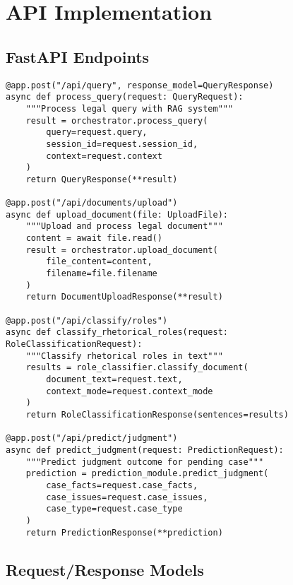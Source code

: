 \documentclass[12pt,a4paper]{article}
\begin{document}
\section{API Implementation}

\subsection{FastAPI Endpoints}

\begin{lstlisting}[caption={API Route Definitions}]
@app.post("/api/query", response_model=QueryResponse)
async def process_query(request: QueryRequest):
    """Process legal query with RAG system"""
    result = orchestrator.process_query(
        query=request.query,
        session_id=request.session_id,
        context=request.context
    )
    return QueryResponse(**result)

@app.post("/api/documents/upload")
async def upload_document(file: UploadFile):
    """Upload and process legal document"""
    content = await file.read()
    result = orchestrator.upload_document(
        file_content=content,
        filename=file.filename
    )
    return DocumentUploadResponse(**result)

@app.post("/api/classify/roles")
async def classify_rhetorical_roles(request: RoleClassificationRequest):
    """Classify rhetorical roles in text"""
    results = role_classifier.classify_document(
        document_text=request.text,
        context_mode=request.context_mode
    )
    return RoleClassificationResponse(sentences=results)

@app.post("/api/predict/judgment")
async def predict_judgment(request: PredictionRequest):
    """Predict judgment outcome for pending case"""
    prediction = prediction_module.predict_judgment(
        case_facts=request.case_facts,
        case_issues=request.case_issues,
        case_type=request.case_type
    )
    return PredictionResponse(**prediction)
\end{lstlisting}

\subsection{Request/Response Models}
\end{document}
